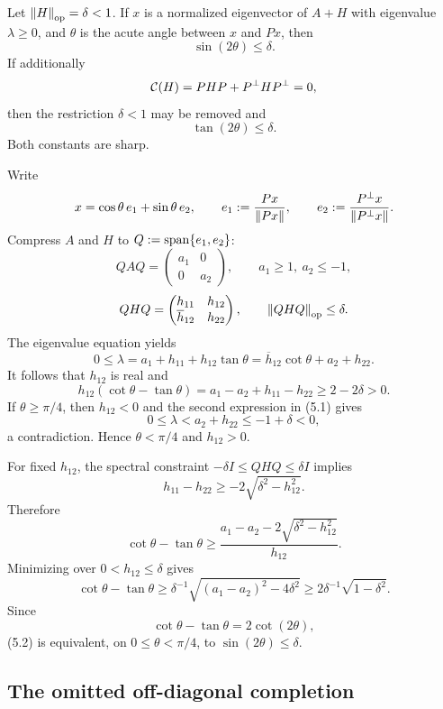 \begin{theorem}[Davis 5.1]
Let $\left\lVert H\right\rVert_{\mathrm{op}}=\delta<1$. If $x$ is a normalized eigenvector of $A+H$ with eigenvalue $\lambda\ge0$, and $\theta$ is the acute angle between $x$ and $Px$, then
\[
  \sin(2\theta)\le\delta.
\]
If additionally
\[
  \mathcal{C}(H)=PHP+P^{\perp}HP^{\perp}=0,
\]
then the restriction $\delta<1$ may be removed and
\[
  \tan(2\theta)\le\delta.
\]
Both constants are sharp.
\end{theorem}

Write
\[
  x=\cos\theta\,e_1+\sin\theta\,e_2,
  \qquad
  e_1:=\frac{Px}{\left\lVert Px\right\rVert},
  \qquad
  e_2:=\frac{P^{\perp}x}{\left\lVert P^{\perp}x\right\rVert}.
\]
Compress $A$ and $H$ to $Q:=\operatorname{span}\{e_1,e_2\}$:
\[
  QAQ=
  \begin{pmatrix}a_1&0\\0&a_2\end{pmatrix},
  \qquad a_1\ge1,\ a_2\le-1,
\]
\[
  QHQ=
  \begin{pmatrix}h_{11}&h_{12}\\\overline{h}_{12}&h_{22}\end{pmatrix},
  \qquad
  \left\lVert QHQ\right\rVert_{\mathrm{op}}\le\delta.
\]
The eigenvalue equation yields
\begin{equation}
  0\le\lambda
  =a_1+h_{11}+h_{12}\tan\theta
  =\overline{h}_{12}\cot\theta+a_2+h_{22}. \tag{5.1}
\end{equation}
It follows that $h_{12}$ is real and
\[
  h_{12}(\cot\theta-\tan\theta)
  =a_1-a_2+h_{11}-h_{22}
  \ge2-2\delta>0.
\]
If $\theta\ge\pi/4$, then $h_{12}<0$ and the second expression in (5.1) gives
\[
  0\le\lambda<a_2+h_{22}\le-1+\delta<0,
\]
a contradiction. Hence $\theta<\pi/4$ and $h_{12}>0$.

For fixed $h_{12}$, the spectral constraint $-\delta I\le QHQ\le\delta I$ implies
\[
  h_{11}-h_{22}
  \ge-2\sqrt{\delta^2-h_{12}^2}.
\]
Therefore
\[
  \cot\theta-\tan\theta
  \ge
  \frac{a_1-a_2-2\sqrt{\delta^2-h_{12}^2}}{h_{12}}.
\]
Minimizing over $0<h_{12}\le\delta$ gives
\begin{equation}
  \cot\theta-\tan\theta
  \ge
  \delta^{-1}\sqrt{(a_1-a_2)^2-4\delta^2}
  \ge2\delta^{-1}\sqrt{1-\delta^2}. \tag{5.2}
\end{equation}
Since
\[
  \cot\theta-\tan\theta=2\cot(2\theta),
\]
(5.2) is equivalent, on $0\le\theta<\pi/4$, to $\sin(2\theta)\le\delta$.

\subsection{The omitted off-diagonal completion}


